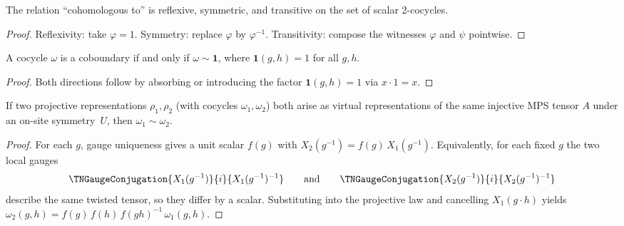 \begin{theorem}%
    \label{thm:cohomologous_equivalence}
    \leanok
    The relation ``cohomologous to'' is reflexive, symmetric, and
    transitive on the set of scalar 2-cocycles.
\end{theorem}

\begin{proof}\leanok{}
    Reflexivity: take $\varphi = 1$.
    Symmetry: replace $\varphi$ by $\varphi^{-1}$.
    Transitivity: compose the witnesses $\varphi$ and $\psi$ pointwise.
\end{proof}

\begin{lemma}%
    \label{lem:coboundary_iff_cohomologous_one}
    \leanok
    A cocycle $\omega$ is a coboundary if and only if
    $\omega \sim \mathbf{1}$, where $\mathbf{1}(g,h)=1$ for all $g,h$.
\end{lemma}

\begin{proof}\leanok{}
    Both directions follow by absorbing or introducing the factor
    $\mathbf{1}(g,h)=1$ via $x\cdot 1 = x$.
\end{proof}

\begin{theorem}%
    \label{thm:cocycle_gauge_independence}
    \leanok
    If two projective representations $\rho_1,\rho_2$ (with cocycles
    $\omega_1,\omega_2$) both arise as virtual representations of the
    same injective MPS tensor $A$ under an on-site symmetry~$U$, then
    $\omega_1 \sim \omega_2$.
\end{theorem}

\begin{proof}\leanok
    For each $g$, gauge uniqueness gives a unit scalar $f(g)$ with
    $X_2(g^{-1}) = f(g)\,X_1(g^{-1})$.
    Equivalently, for each fixed $g$ the two local gauges
    \[
        \TNGaugeConjugation{X_1(g^{-1})}{i}{X_1(g^{-1})^{-1}}
        \qquad\text{and}\qquad
        \TNGaugeConjugation{X_2(g^{-1})}{i}{X_2(g^{-1})^{-1}}
    \]
    describe the same twisted tensor, so they differ by a scalar.
    Substituting into the projective law and cancelling $X_1(g\cdot h)$
    yields
    $\omega_2(g,h) = f(g)\,f(h)\,f(gh)^{-1}\,\omega_1(g,h)$.
\end{proof}

